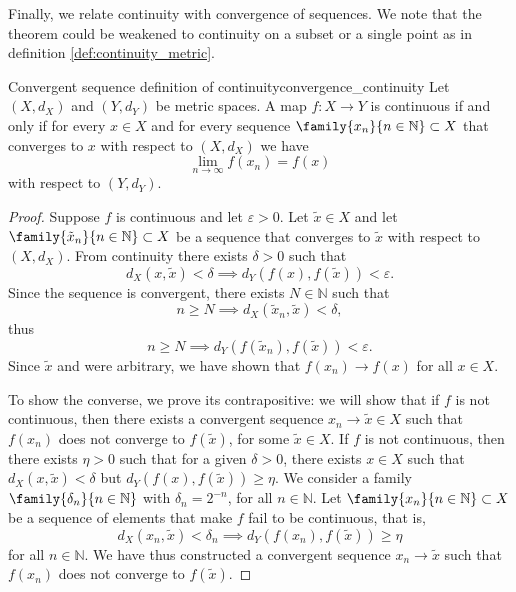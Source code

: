 Finally, we relate continuity with convergence of sequences. We note that the theorem could be weakened to continuity on a subset or a single point as in definition \cref{def:continuity_metric}.
\begin{theorem}{Convergent sequence definition of continuity}{convergence_continuity}
    Let \((X, d_X)\) and \((Y, d_Y)\) be metric spaces. A map \(f : X \to Y\) is continuous if and only if for every \(x \in X\) and for every sequence \(\family{x_n}{n \in \mathbb{N}} \subset X\) that converges to \(x\) with respect to \((X, d_X)\) we have
    \begin{equation*}
        \lim_{n \to \infty} f(x_n) = f(x)
    \end{equation*}
    with respect to \((Y, d_Y)\).
\end{theorem}
\begin{proof}
    Suppose \(f\) is continuous and let \(\varepsilon > 0\). Let \(\tilde{x} \in X\) and let \(\family{\tilde{x}_n}{n\in \mathbb{N}} \subset X\) be a sequence that converges to \(\tilde{x}\) with respect to \((X, d_X)\). From continuity there exists \(\delta > 0\) such that
    \begin{equation*}
        d_X(x, \tilde{x}) < \delta \implies d_Y(f(x), f(\tilde{x})) < \varepsilon.
    \end{equation*}
    Since the sequence is convergent, there exists \(N \in \mathbb{N}\) such that
    \begin{equation*}
        n \geq N \implies d_X(\tilde{x}_n, \tilde{x}) < \delta,
    \end{equation*}
    thus
    \begin{equation*}
        n \geq N \implies d_Y(f(\tilde{x}_n), f(\tilde{x})) < \varepsilon.
    \end{equation*}
    Since \(\tilde{x}\) and  were arbitrary, we have shown that \(f(x_n) \to f(x)\) for all \(x \in X\).

    To show the converse, we prove its contrapositive: we will show that if \(f\) is not continuous, then there exists a convergent sequence \(x_n\to \tilde{x} \in X\) such that \(f(x_n)\) does not converge to \(f(\tilde{x})\), for some \(\tilde{x} \in X\). If \(f\) is not continuous, then there exists \(\eta > 0\) such that for a given \(\delta > 0\), there exists \(x \in X\) such that \(d_X(x, \tilde{x}) < \delta\) but \(d_Y(f(x), f(\tilde{x})) \geq \eta\). We consider a family \(\family{\delta_n}{n\in \mathbb{N}}\) with \(\delta_n = 2^{-n}\), for all \(n \in \mathbb{N}\). Let \(\family{x_n}{n\in \mathbb{N}}\subset X\) be a sequence of elements that make \(f\) fail to be continuous, that is,
    \begin{equation*}
        d_X(x_n ,\tilde{x}) < \delta_n \implies d_Y(f(x_n), f(\tilde{x})) \geq \eta
    \end{equation*}
    for all \(n \in \mathbb{N}\). We have thus constructed a convergent sequence \(x_n \to \tilde{x}\) such that \(f(x_n)\) does not converge to \(f(\tilde{x})\).
\end{proof}
